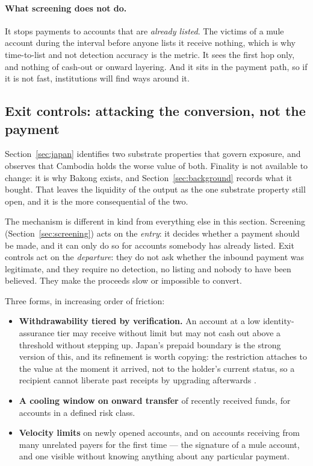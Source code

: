 \documentclass[10pt,a4paper,twocolumn]{article}
\begin{document}
\paragraph{What screening does not do.}
It stops payments to accounts that are \emph{already listed}. The victims of a
mule account during the interval before anyone lists it receive nothing, which
is why time-to-list and not detection accuracy is the metric. It sees the first
hop only, and nothing of cash-out or onward layering. And it sits in the payment
path, so if it is not fast, institutions will find ways around it.

\subsection{Exit controls: attacking the conversion, not the payment}
\label{sec:exit}

Section~\ref{sec:japan} identifies two substrate properties that govern
exposure, and observes that Cambodia holds the worse value of both. Finality is
not available to change: it is why Bakong exists, and Section~\ref{sec:background}
records what it bought. That leaves the liquidity of the output as the one
substrate property still open, and it is the more consequential of the two.

The mechanism is different in kind from everything else in this section.
Screening (Section~\ref{sec:screening}) acts on the \emph{entry}: it decides
whether a payment should be made, and it can only do so for accounts somebody
has already listed. Exit controls act on the \emph{departure}: they do not ask
whether the inbound payment was legitimate, and they require no detection, no
listing and nobody to have been believed. They make the proceeds slow or
impossible to convert.

Three forms, in increasing order of friction:

\begin{itemize}[leftmargin=1.4em]
  \item \textbf{Withdrawability tiered by verification.} An account at a low
    identity-assurance tier may receive without limit but may not cash out above
    a threshold without stepping up. Japan's prepaid boundary is the strong
    version of this, and its refinement is worth copying: the restriction
    attaches to the value at the moment it arrived, not to the holder's current
    status, so a recipient cannot liberate past receipts by upgrading afterwards
    \citep{paypaybalance}.
  \item \textbf{A cooling window on onward transfer} of recently received funds,
    for accounts in a defined risk class.
  \item \textbf{Velocity limits} on newly opened accounts, and on accounts
    receiving from many unrelated payers for the first time --- the signature of
    a mule account, and one visible without knowing anything about any
    particular payment.
\end{itemize}
\end{document}
